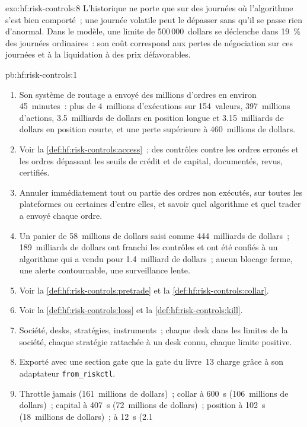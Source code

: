 \begin{solution}{exo:hf:risk-controls:8}
L'historique ne porte que sur des journées où l'algorithme s'est bien comporté~; une journée volatile peut le dépasser sans qu'il se passe rien d'anormal. Dans
le modèle, une limite de 500\,000~dollars se déclenche dans 19~\% des journées ordinaires~: son coût correspond aux pertes de négociation sur ces journées et à la liquidation à des prix défavorables.
\end{solution}

\begin{solution}{pb:hf:risk-controls:1}
\begin{enumerate}
\item Son système de routage a envoyé des millions d'ordres en environ 45~minutes~: plus de 4~millions d'exécutions sur 154~valeurs, 397~millions d'actions, 3.5~milliards de dollars
en position longue et 3.15~milliards de dollars en position courte, et une perte supérieure à 460~millions de dollars.
\item Voir la \cref{def:hf:risk-controls:access}~; des contrôles contre les ordres erronés et les ordres dépassant les seuils de crédit et de capital, documentés, revus,
certifiés.
\item Annuler immédiatement tout ou partie des ordres non exécutés, sur toutes les plateformes ou certaines d'entre elles, et savoir quel algorithme et quel trader a envoyé chaque ordre.
\item Un panier de 58~millions de dollars saisi comme 444~milliards de dollars~; 189~milliards de dollars ont franchi les contrôles et ont été confiés à un algorithme qui a vendu pour 1.4~milliard de dollars~; aucun blocage ferme, une
alerte contournable, une surveillance lente.
\item Voir la \cref{def:hf:risk-controls:pretrade} et la \cref{def:hf:risk-controls:collar}.
\item Voir la \cref{def:hf:risk-controls:loss} et la \cref{def:hf:risk-controls:kill}.
\item Société, desks, stratégies, instruments~; chaque desk dans les limites de la société, chaque stratégie rattachée à un desk connu, chaque limite positive.
\item \begin{sloppypar}Exporté avec une section gate que la gate du livre~13 charge grâce à son adaptateur \texttt{from\_riskctl}.\end{sloppypar}
\item Throttle jamais (161~millions de dollars)~; collar à 600~s (106~millions de dollars)~; capital à 407~s (72~millions de dollars)~; position à 102~s (18~millions de dollars)~;  à 12~s (2.1~

\end{enumerate}
\end{solution}
